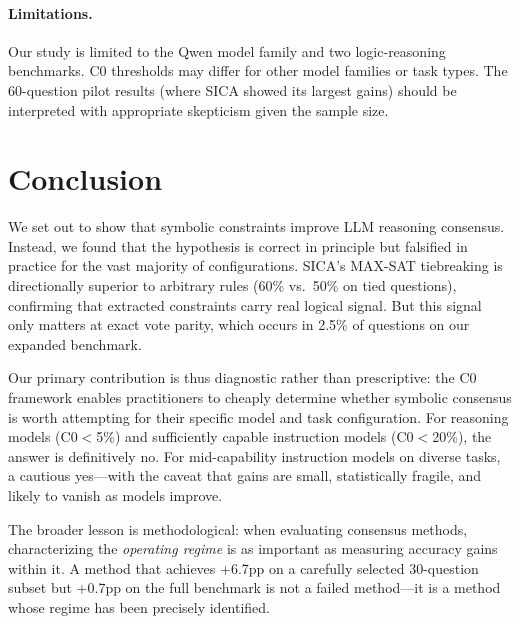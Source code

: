 \documentclass[11pt]{article}
\begin{document}
\paragraph{Limitations.} Our study is limited to the Qwen model family and two logic-reasoning benchmarks. C0 thresholds may differ for other model families or task types. The 60-question pilot results (where SICA showed its largest gains) should be interpreted with appropriate skepticism given the sample size.

\section{Conclusion}

We set out to show that symbolic constraints improve LLM reasoning consensus. Instead, we found that the hypothesis is correct in principle but falsified in practice for the vast majority of configurations. SICA's MAX-SAT tiebreaking is directionally superior to arbitrary rules (60\% vs.\ 50\% on tied questions), confirming that extracted constraints carry real logical signal. But this signal only matters at exact vote parity, which occurs in 2.5\% of questions on our expanded benchmark.

Our primary contribution is thus diagnostic rather than prescriptive: the C0 framework enables practitioners to cheaply determine whether symbolic consensus is worth attempting for their specific model and task configuration. For reasoning models (C0$<$5\%) and sufficiently capable instruction models (C0$<$20\%), the answer is definitively no. For mid-capability instruction models on diverse tasks, a cautious yes---with the caveat that gains are small, statistically fragile, and likely to vanish as models improve.

The broader lesson is methodological: when evaluating consensus methods, characterizing the \emph{operating regime} is as important as measuring accuracy gains within it. A method that achieves +6.7pp on a carefully selected 30-question subset but +0.7pp on the full benchmark is not a failed method---it is a method whose regime has been precisely identified.
\end{document}
